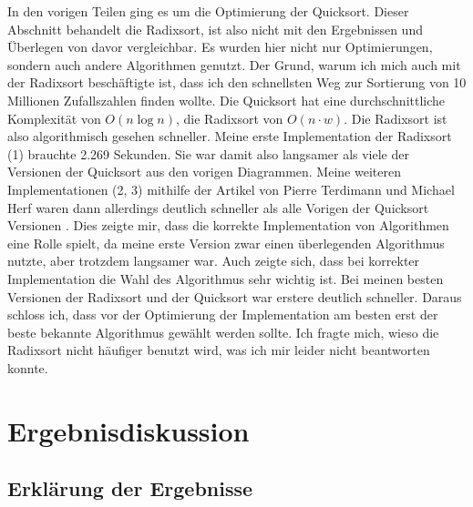 \documentclass[11pt,a4paper]{article}
\begin{document}
In den vorigen Teilen ging es um die Optimierung der Quicksort. Dieser Abschnitt
behandelt die Radixsort, ist also nicht mit den Ergebnissen und Überlegen von davor vergleichbar.
Es wurden hier nicht nur Optimierungen, sondern auch andere Algorithmen genutzt.
Der Grund, warum ich mich auch mit der Radixsort beschäftigte ist, dass ich
den schnellsten Weg zur Sortierung von 10 Millionen Zufallszahlen finden wollte.
Die Quicksort hat eine durchschnittliche Komplexität von \boldmath$O(n\log n)$,
die Radixsort von \boldmath$O(n \cdot w)$. Die Radixsort ist also algorithmisch gesehen schneller.
Meine erste Implementation der Radixsort (1) brauchte 2.269 Sekunden. Sie war damit
also langsamer als viele der Versionen der Quicksort aus den vorigen Diagrammen.
Meine weiteren Implementationen (2, 3) mithilfe der Artikel von Pierre Terdimann und
Michael Herf waren dann allerdings deutlich schneller als alle Vorigen der Quicksort Versionen
\cite{terdiman} \cite{michael}.
Dies zeigte mir, dass die korrekte Implementation von Algorithmen eine Rolle spielt,
da meine erste Version zwar einen überlegenden Algorithmus nutzte, aber trotzdem
langsamer war. Auch zeigte sich, dass bei korrekter Implementation die Wahl des
Algorithmus sehr wichtig ist. Bei meinen besten Versionen der Radixsort und der Quicksort
war erstere deutlich schneller. Daraus schloss ich, dass vor der Optimierung der
Implementation am besten erst der beste bekannte Algorithmus gewählt werden sollte.
Ich fragte mich, wieso die Radixsort nicht häufiger benutzt wird, was ich mir leider nicht
beantworten konnte.

\clearpage

\section{Ergebnisdiskussion}

\subsection{Erklärung der Ergebnisse}
\end{document}
